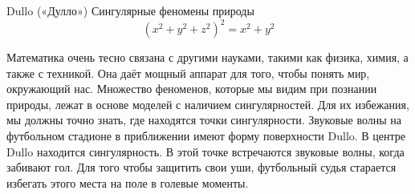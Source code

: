 \begin{surferPage}{Dullo («Дулло»)}
Сингулярные феномены природы\\
\smallskip
\[(x^2+ y^2+ z^2)^2	= x^2+ y^2\]

\singlespacing
Математика очень тесно связана с другими науками, такими как физика, химия, а также с техникой. Она даёт мощный аппарат для того, чтобы понять мир, окружающий нас.
\singlespacing
Множество феноменов, которые мы видим при познании природы, лежат в основе моделей с наличием сингулярностей. Для их избежания, мы должны точно знать, где находятся точки сингулярности. 
\singlespacing
Звуковые волны на футбольном стадионе в приближении имеют форму поверхности Dullo. В центре Dullo находится сингулярность. В этой точке встречаются звуковые волны, когда забивают гол. Для того чтобы защитить свои уши, футбольный судья старается избегать этого места на поле в голевые моменты.
\end{surferPage}
